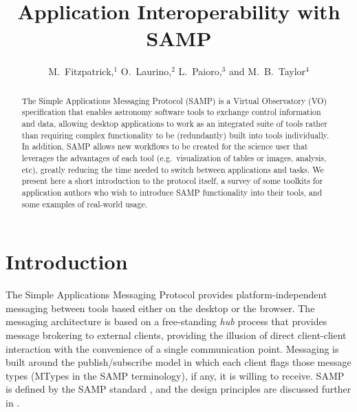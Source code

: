 
\resetcounters




\title{Application Interoperability with SAMP}
\author{M.~Fitzpatrick,$^1$ O.~Laurino,$^2$ L.~Paioro,$^3$ and M.~B.~Taylor$^4$
}



\begin{abstract}
The Simple Applications Messaging Protocol (SAMP) is a Virtual Observatory
(VO) specification that enables astronomy software tools to exchange
control information and data, allowing desktop applications to work as
an integrated suite of tools rather than requiring complex functionality
to be (redundantly) built into tools individually. In addition, SAMP
allows new workflows to be created for the science user that leverages
the advantages of each tool (e.g.\ visualization of tables or images,
analysis, etc), greatly reducing the time needed to switch between
applications and tasks.
We present here a short introduction to the protocol itself,
a survey of some toolkits for application authors who wish to
introduce SAMP functionality into their tools,
and some examples of real-world usage.
\end{abstract}

\section{Introduction}

The Simple Applications Messaging Protocol provides
platform-independent messaging between tools based either on
the desktop or the browser.
The messaging architecture is based on a free-standing {\em hub\/} process
that provides message brokering to external clients,
providing the illusion of direct client-client interaction
with the convenience of a single communication point.
Messaging is built around the publish/subscribe model in which
each client flags those message types (MTypes in the SAMP terminology),
if any, it is willing to receive.
SAMP is defined by the SAMP standard \citep{samp1.3}, and
the design principles are discussed further in \citet{taylor2011}.


